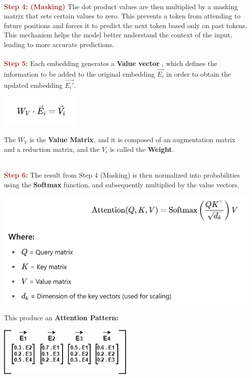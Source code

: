 \documentclass[12pt]{article}
\begin{document}
\textcolor{brown}{\textbf{\\Step 4: (Masking)}} The dot product values are then multiplied by a masking matrix that sets certain values to zero. This prevents a token from attending to future positions and forces it to predict the next token based only on past tokens. This mechanism helps the model better understand the context of the input, leading to more accurate predictions.\\

\textcolor{brown}{\textbf{\\Step 5: }} Each embedding generates a \textbf{Value vector }, which defines the information to be added to the original embedding \( \vec{E_i} \) in order to obtain the updated embedding \( \vec{E_i'} \).\\
\begin{center}
\includegraphics[width=0.3\textwidth]{images/formula3.png}
\end{center}
The \( W_V \) is the \textbf{Value Matrix}, and it is composed of an augmentation matrix and a reduction matrix, and the \( V_i \) is called the \textbf{Weight}.

\textcolor{brown}{\textbf{\\Step 6: }} The result from Step 4 (Masking) is then normalized into probabilities using the \textbf{Softmax} function, and subsequently multiplied by the value vectors.\\
\begin{center}
\includegraphics[width=\textwidth]{images/formula4.png}
\end{center}
This produce an \textbf{Attention Pattern:\\}
\begin{center}
    \includegraphics[width=0.5\textwidth]{images/llm5.png}
\end{center}
\end{document}

